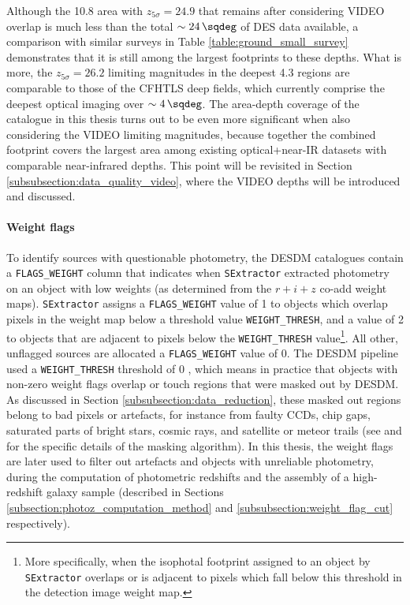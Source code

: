 Although the \SI{10.8}{\sqdeg} area with $z_{5\sigma}=24.9$ that remains after considering VIDEO overlap is much less than the total $\sim\SI{24}{\sqdeg}$ of DES data available, a comparison with similar surveys in Table \ref{table:ground_small_survey} demonstrates that it is still among the largest footprints to these depths. What is more, the $z_{5\sigma}=26.2$ limiting magnitudes in the deepest \SI{4.3}{\sqdeg} regions are comparable to those of the CFHTLS deep fields, which currently comprise the deepest optical imaging over $\sim \SI{4}{\sqdeg}$. The area-depth coverage of the catalogue in this thesis turns out to be even more significant when also considering the VIDEO limiting magnitudes, because together the \DESVIDEO combined footprint covers the largest area among existing optical+near-IR datasets with comparable near-infrared depths.  This point will be revisited in Section \ref{subsubsection:data_quality_video}, where the VIDEO depths will be introduced and discussed.  \par



\paragraph{Weight flags}
To identify sources with questionable photometry, the DESDM catalogues contain a \texttt{FLAGS\_WEIGHT} column that indicates when \texttt{SExtractor} extracted photometry on an object with low weights (as determined from the $r+i+z$ co-add weight maps). \texttt{SExtractor} assigns a \texttt{FLAGS\_WEIGHT} value of 1 to objects which overlap pixels in the weight map below a threshold value \texttt{WEIGHT\_THRESH}, and a value of 2 to objects that are adjacent to pixels below the \texttt{WEIGHT\_THRESH} value\footnote{More specifically, when the isophotal footprint assigned to an object by \texttt{SExtractor} overlaps or is adjacent to pixels which fall below this threshold in the detection image weight map.}. All other, unflagged sources are allocated a \texttt{FLAGS\_WEIGHT} value of 0. The DESDM pipeline used a \texttt{WEIGHT\_THRESH} threshold of 0 \citep{2018PASP..130g4501M}, which means in practice that objects with non-zero weight flags overlap or touch regions that were masked out by DESDM. As discussed in Section \ref{subsubsection:data_reduction}, these masked out regions belong to bad pixels or artefacts, for instance from faulty CCDs, chip gaps, saturated parts of bright stars, cosmic rays, and satellite or meteor trails (see \citealt{2018ApJS..235...33D} and \citealt{2018PASP..130g4501M} for the specific details of the masking algorithm). In this thesis, the weight flags are later used to filter out artefacts and objects with unreliable photometry, during the computation of \DESVIDEO photometric redshifts and the assembly of a high-redshift galaxy sample (described in Sections \ref{subsection:photoz_computation_method} and \ref{subsubsection:weight_flag_cut} respectively). \par







